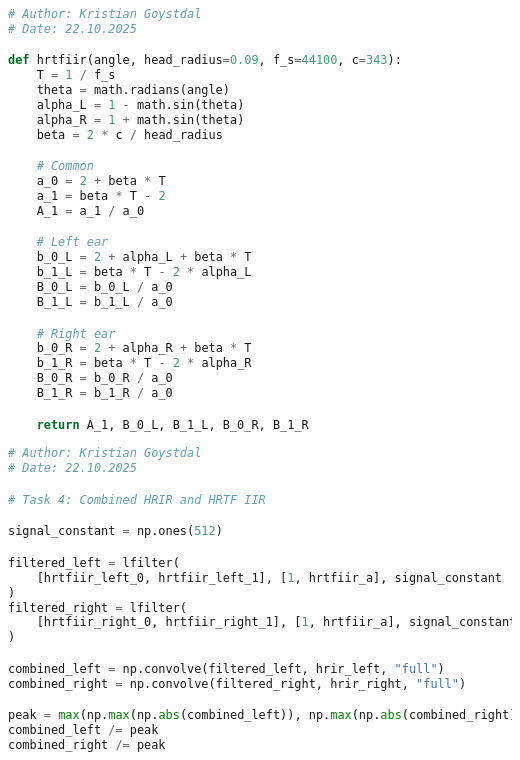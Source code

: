 \begin{lstlisting}[language=Python, caption={hrtfiir.py}, label={lst:hrtfirr}]
# Author: Kristian Goystdal
# Date: 22.10.2025

def hrtfiir(angle, head_radius=0.09, f_s=44100, c=343):
    T = 1 / f_s
    theta = math.radians(angle)
    alpha_L = 1 - math.sin(theta)
    alpha_R = 1 + math.sin(theta)
    beta = 2 * c / head_radius

    # Common
    a_0 = 2 + beta * T
    a_1 = beta * T - 2
    A_1 = a_1 / a_0

    # Left ear
    b_0_L = 2 + alpha_L + beta * T
    b_1_L = beta * T - 2 * alpha_L
    B_0_L = b_0_L / a_0
    B_1_L = b_1_L / a_0

    # Right ear
    b_0_R = 2 + alpha_R + beta * T
    b_1_R = beta * T - 2 * alpha_R
    B_0_R = b_0_R / a_0
    B_1_R = b_1_R / a_0

    return A_1, B_0_L, B_1_L, B_0_R, B_1_R

\end{lstlisting}

\begin{lstlisting}[language=Python, caption={Excerpt from main.py}, label={lst:combined}]
# Author: Kristian Goystdal
# Date: 22.10.2025

# Task 4: Combined HRIR and HRTF IIR

signal_constant = np.ones(512)

filtered_left = lfilter(
    [hrtfiir_left_0, hrtfiir_left_1], [1, hrtfiir_a], signal_constant
)
filtered_right = lfilter(
    [hrtfiir_right_0, hrtfiir_right_1], [1, hrtfiir_a], signal_constant
)

combined_left = np.convolve(filtered_left, hrir_left, "full")
combined_right = np.convolve(filtered_right, hrir_right, "full")

peak = max(np.max(np.abs(combined_left)), np.max(np.abs(combined_right)))
combined_left /= peak
combined_right /= peak

\end{lstlisting}


